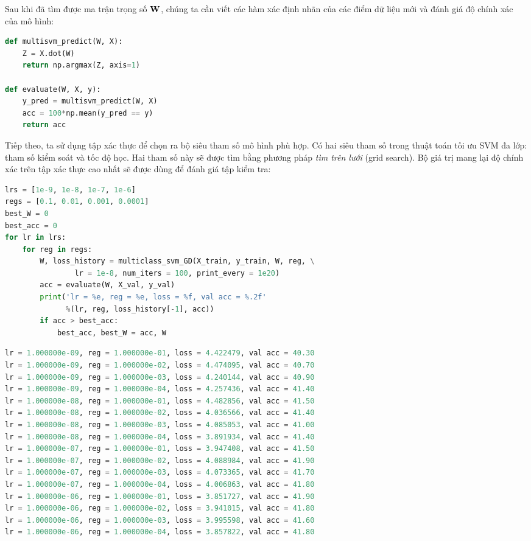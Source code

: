 Sau khi đã tìm được ma trận trọng số $\mathbf{W}$,
chúng ta cần viết các hàm xác định nhãn của các điểm dữ liệu mới và đánh giá độ chính xác của mô hình:
\begin{lstlisting}[language=Python]
def multisvm_predict(W, X):
    Z = X.dot(W)
    return np.argmax(Z, axis=1)

def evaluate(W, X, y):
    y_pred = multisvm_predict(W, X)
    acc = 100*np.mean(y_pred == y)
    return acc
\end{lstlisting}

Tiếp theo, ta sử dụng tập xác thực để chọn ra bộ siêu tham số mô hình phù
hợp. Có hai siêu tham số trong thuật toán tối ưu SVM đa lớp: tham số kiểm soát và tốc độ học. Hai tham số này sẽ được tìm
bằng phương pháp \textit{tìm trên lưới} (grid search). Bộ giá trị mang lại độ chính xác trên tập xác thực cao nhất sẽ được dùng để đánh giá tập kiểm tra:
\begin{lstlisting}[language=Python]
lrs = [1e-9, 1e-8, 1e-7, 1e-6]
regs = [0.1, 0.01, 0.001, 0.0001]
best_W = 0
best_acc = 0
for lr in lrs:
    for reg in regs:
        W, loss_history = multiclass_svm_GD(X_train, y_train, W, reg, \
                lr = 1e-8, num_iters = 100, print_every = 1e20)
        acc = evaluate(W, X_val, y_val)
        print('lr = %e, reg = %e, loss = %f, val acc = %.2f'
              %(lr, reg, loss_history[-1], acc))
        if acc > best_acc:
            best_acc, best_W = acc, W
\end{lstlisting}
\kq
\begin{lstlisting}[language=Python]
lr = 1.000000e-09, reg = 1.000000e-01, loss = 4.422479, val acc = 40.30
lr = 1.000000e-09, reg = 1.000000e-02, loss = 4.474095, val acc = 40.70
lr = 1.000000e-09, reg = 1.000000e-03, loss = 4.240144, val acc = 40.90
lr = 1.000000e-09, reg = 1.000000e-04, loss = 4.257436, val acc = 41.40
lr = 1.000000e-08, reg = 1.000000e-01, loss = 4.482856, val acc = 41.50
lr = 1.000000e-08, reg = 1.000000e-02, loss = 4.036566, val acc = 41.40
lr = 1.000000e-08, reg = 1.000000e-03, loss = 4.085053, val acc = 41.00
lr = 1.000000e-08, reg = 1.000000e-04, loss = 3.891934, val acc = 41.40
lr = 1.000000e-07, reg = 1.000000e-01, loss = 3.947408, val acc = 41.50
lr = 1.000000e-07, reg = 1.000000e-02, loss = 4.088984, val acc = 41.90
lr = 1.000000e-07, reg = 1.000000e-03, loss = 4.073365, val acc = 41.70
lr = 1.000000e-07, reg = 1.000000e-04, loss = 4.006863, val acc = 41.80
lr = 1.000000e-06, reg = 1.000000e-01, loss = 3.851727, val acc = 41.90
lr = 1.000000e-06, reg = 1.000000e-02, loss = 3.941015, val acc = 41.80
lr = 1.000000e-06, reg = 1.000000e-03, loss = 3.995598, val acc = 41.60
lr = 1.000000e-06, reg = 1.000000e-04, loss = 3.857822, val acc = 41.80
\end{lstlisting}
